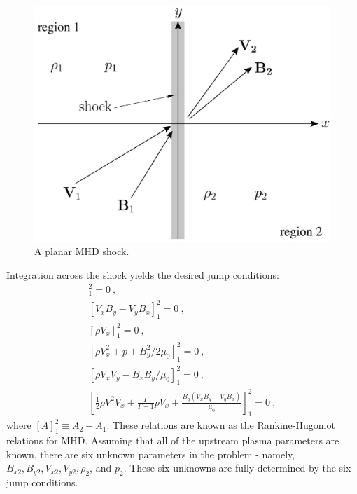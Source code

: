 \documentclass[12pt,a4paper]{article}
\begin{document}
\begin{figure}
\centering
\includegraphics[height=9.cm,angle=0]{MHD_shock.eps}
\caption{
A planar MHD shock.
} 
\label{fig:MHD_shock}
\end{figure}

Integration across the shock yields the desired jump conditions:
\begin{align}
[B_x]_1^2 = 0 ~, \\
[V_x B_y - V_y B_x]_1^2 = 0 ~, \\
[\rho V_x]_1^2 = 0 ~, \\
[\rho V_x^2 +p +B_y^2 /2\mu_0]_1^2 = 0 ~, \\
[\rho V_xV_y -B_xB_y /\mu_0]_1^2 = 0 ~, \\
\left[\frac{1 }{2} \rho V^2 V_x + \frac{\Gamma }{\Gamma -1} p V_x + \frac{B_y(V_x B_y -V_y B_x) }{\mu_0} \right]_1^2 = 0 ~,
\end{align}
where $[A]_1^2 \equiv A_2 - A_1$. These relations are known as the Rankine-Hugoniot relations for MHD. Assuming that all of the upstream plasma parameters are known, there are six unknown parameters in the problem - namely, $B_{x2}, B_{y 2}, V_{x 2}, V_{y 2}, \rho_2$, and $p_2$. These six unknowns are fully determined by the six jump conditions. 
\end{document}
